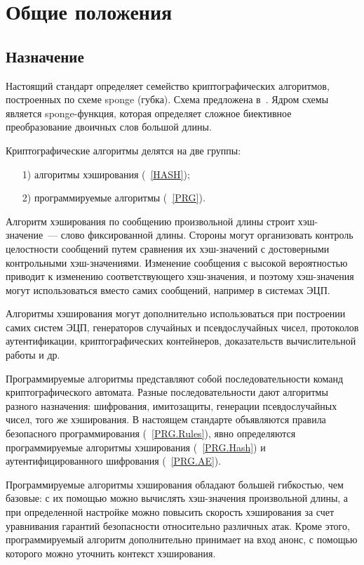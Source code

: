 \chapter{Общие положения}\label{COMMON}

\section{Назначение}

Настоящий стандарт определяет семейство криптографических алгоритмов,
построенных по схеме sponge (губка). Схема предложена в~\cite{Sponge}. 
Ядром схемы является sponge-функция, которая определяет сложное биективное 
преобразование двоичных слов большой длины. 

Криптографические алгоритмы делятся на две группы:
\begin{enumerate}
\item[1)]
алгоритмы хэширования (~\ref{HASH});
\item[2)]
программируемые алгоритмы (~\ref{PRG}).
\end{enumerate}

Алгоритм хэширования по сообщению произвольной длины строит 
хэш-значение~--- слово фиксированной длины.
%
Стороны могут организовать контроль целостности сообщений
путем сравнения их хэш-значений с достоверными контрольными хэш-значениями.
%
Изменение сообщения с высокой вероятностью приводит к изменению
соответствующего хэш-значения, и поэтому хэш-значения могут использоваться
вместо самих сообщений, например в системах ЭЦП.

Алгоритмы хэширования могут дополнительно использоваться при построении 
самих систем ЭЦП, генераторов случайных и псевдослучайных чисел, 
протоколов аутентификации,
криптографических контейнеров, 
доказательств вычислительной работы и др.

Программируемые алгоритмы представляют собой последовательности команд 
криптографического автомата. Разные последовательности дают алгоритмы разного 
назначения: шифрования, имитозащиты, генерации псевдослучайных чисел, 
того же хэширования.
%
В настоящем стандарте объявляются 
правила безопасного программирования (~\ref{PRG.Rules}),
явно определяются программируемые алгоритмы хэширования (~\ref{PRG.Hash}) 
и аутентифицированного шифрования (~\ref{PRG.AE}).

Программируемые алгоритмы хэширования обладают большей гибкостью, чем базовые: 
с их помощью можно вычислять хэш-значения произвольной длины,
а при определенной настройке можно повысить скорость хэширования 
за счет уравнивания гарантий безопасности относительно различных атак.
%
Кроме этого, программируемый алгоритм дополнительно принимает на вход анонс,
с помощью которого можно уточнить контекст хэширования.

